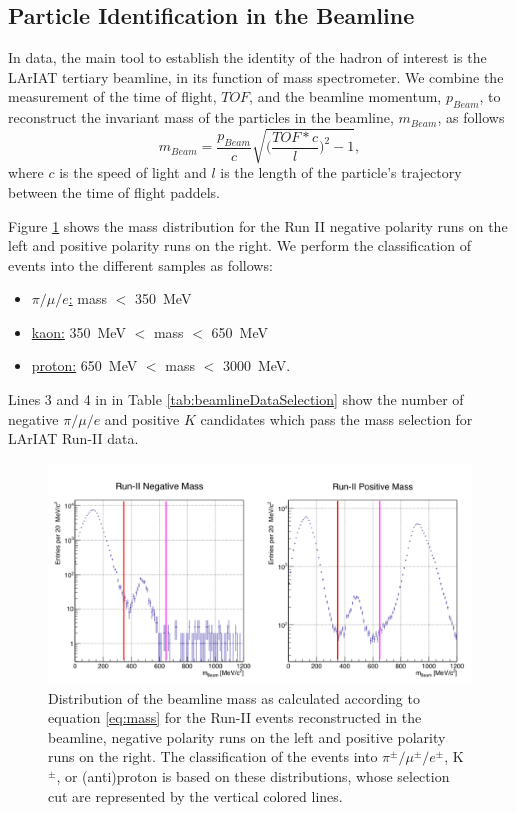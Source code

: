 \subsection{Particle Identification in the Beamline}
In data, the main tool to establish the identity of the hadron of interest is the LArIAT tertiary beamline, in its function of mass spectrometer. We combine the measurement of the time of flight, $TOF$, and the beamline momentum, $p_{Beam}$, to reconstruct the invariant mass of the particles in the beamline, $m_{Beam}$, as follows
\begin{equation}
m_{Beam} = \frac{p_{Beam}}{c}\sqrt{\biggl(\frac{TOF*c}{l}\biggr)^2 -1},
\label{eq:mass}
\end{equation}
 where $c$ is the speed of light and $l$ is the length of the particle's trajectory between the time of flight paddels. 

Figure \ref{fig:mass} shows the mass distribution for the Run II negative polarity runs on the left and positive polarity runs on the right. We perform the classification of events into the different samples as follows:

\begin{itemize}
\item \underline{$\pi/\mu/e$:}  mass $<$ 350~MeV

\item \underline{kaon:} 350~MeV $<$ mass $<$ 650~MeV

\item \underline{proton:} 650~MeV $<$ mass $<$ 3000~MeV.

\end{itemize}

Lines 3 and 4 in in Table \ref{tab:beamlineDataSelection} show the number of negative $\pi/\mu/e$ and positive $K$ candidates which pass the mass selection for LArIAT Run-II data.

\begin{figure}
  \centering  
\includegraphics[width=\textwidth]{Chapter-4/Images/massRunII.png}
\caption{Distribution of the beamline mass as calculated according to equation \ref{eq:mass} for the Run-II events reconstructed in the beamline, negative polarity runs on the left and positive polarity runs on the right. The classification of the events into $\pi^\pm/ \mu^\pm/e^\pm$, K$^\pm$, or (anti)proton is based on these distributions, whose selection cut are represented by the vertical colored lines.}
\label{fig:mass}
\end{figure}


